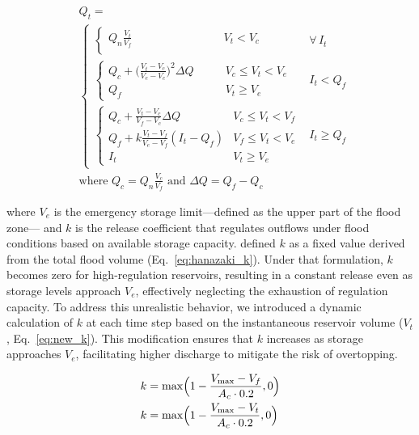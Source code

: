 \documentclass[hess, manuscript]{copernicus}
\begin{document}
\begin{equation}
\label{eq:camaflood}
    \begin{aligned}
    & Q_t = \\
    & \begin{cases}
        \begin{cases}
            Q_n \frac{V_t}{V_f} & \qquad \qquad \qquad \quad \;  V_t < V_c \\
        \end{cases} & \forall \, I_t \\[2ex]
        \begin{cases}
            Q_c + \bigl( \frac{V_t - V_c}{V_e - V_c} \bigr)^2 \Delta Q & \quad \;\;\;\, V_c \leq V_t < V_e \\
            Q_f & \quad \;\;\;\, V_t \geq V_e
        \end{cases} & I_t < Q_f \\[2ex]
        \begin{cases} 
            Q_c + \frac{V_t - V_c}{V_f - V_c} \Delta Q & V_c \leq V_t < V_f \\
            Q_f + k \frac{V_t - V_f}{V_e - V_f} (I_t - Q_f) & V_f \leq V_t < V_e \\
            I_t & V_t \geq V_e
        \end{cases} & I_t \geq Q_f
    \end{cases} \\[1ex]
    & \text{where } Q_c = Q_n \frac{V_c}{V_f} \text{ and } \Delta Q = Q_f - Q_c
    \end{aligned}
\end{equation}

where $V_e$ is the emergency storage limit—defined as the upper part of the flood zone— and $k$ is the release coefficient that regulates outflows under flood conditions based on available storage capacity. \citet{Hanazaki2022} defined $k$ as a fixed value derived from the total flood volume (Eq.~\ref{eq:hanazaki_k}). Under that formulation, $k$ becomes zero for high-regulation reservoirs, resulting in a constant release even as storage levels approach $V_e$, effectively neglecting the exhaustion of regulation capacity. To address this unrealistic behavior, we introduced a dynamic calculation of $k$ at each time step based on the instantaneous reservoir volume ($V_t$, Eq.~\ref{eq:new_k}). This modification ensures that $k$ increases as storage approaches $V_e$, facilitating higher discharge to mitigate the risk of overtopping.

\begin{subequations}
    \label{eq:camaflood_release_coefficient}
    \begin{align}
        k &= \max \Bigl( 1 - \frac{V_{\max} - V_f}{A_{c} \cdot 0.2}, 0 \Bigr) \label{eq:hanazaki_k}\\
        k &= \max \Bigl( 1 - \frac{V_{\max} - V_t}{A_{c} \cdot 0.2}, 0 \Bigr) \label{eq:new_k}
    \end{align}
\end{subequations}
\end{document}
